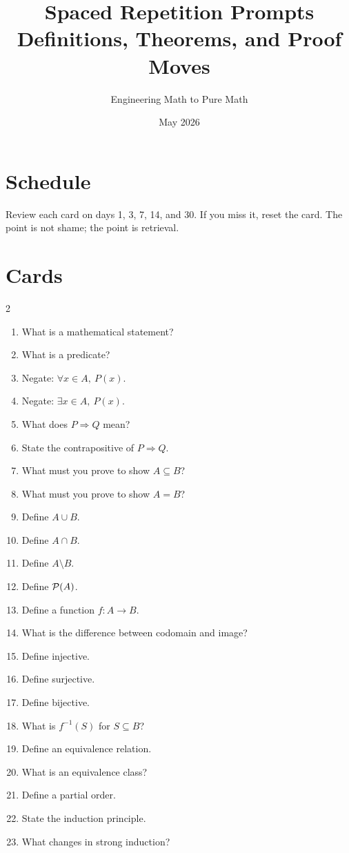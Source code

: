 \documentclass[11pt]{article}
\title{\textbf{Spaced Repetition Prompts}\\Definitions, Theorems, and Proof Moves}
\author{Engineering Math to Pure Math}
\date{May 2026}
\begin{document}
\maketitle

\section{Schedule}

Review each card on days 1, 3, 7, 14, and 30. If you miss it, reset the card. The point is not shame; the point is retrieval.

\section{Cards}

\begin{multicols}{2}
\begin{enumerate}
\item What is a mathematical statement?
\item What is a predicate?
\item Negate: $\forall x\in A,\ P(x)$.
\item Negate: $\exists x\in A,\ P(x)$.
\item What does $P\Rightarrow Q$ mean?
\item State the contrapositive of $P\Rightarrow Q$.
\item What must you prove to show $A\subseteq B$?
\item What must you prove to show $A=B$?
\item Define $A\cup B$.
\item Define $A\cap B$.
\item Define $A\setminus B$.
\item Define $\mathcal{P}(A)$.
\item Define a function $f:A\to B$.
\item What is the difference between codomain and image?
\item Define injective.
\item Define surjective.
\item Define bijective.
\item What is $f^{-1}(S)$ for $S\subseteq B$?
\item Define an equivalence relation.
\item What is an equivalence class?
\item Define a partial order.
\item State the induction principle.
\item What changes in strong induction?

\end{enumerate}
\end{multicols}
\end{document}
